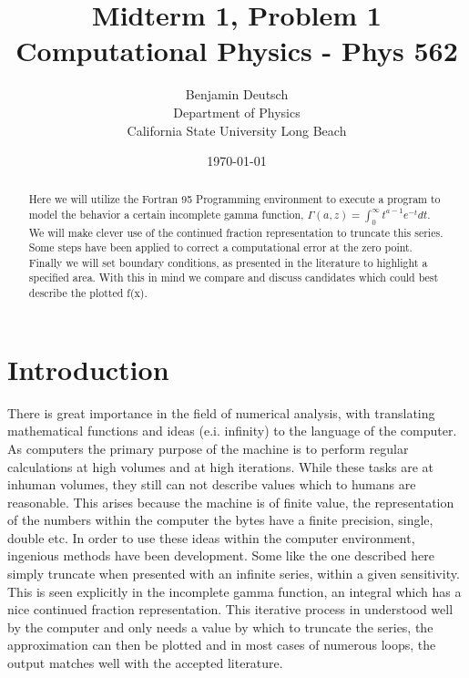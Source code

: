 \documentclass[12pt,letterpaper,notitlepage]{article}
\begin{document}




\title{%
	Midterm 1, Problem 1 \\
\large Computational Physics - Phys 562}
\author{Benjamin Deutsch  \\
Department of Physics\\
California State University Long Beach}
\date{\today}

  
\maketitle



\begin{abstract}
Here we will utilize the Fortran 95 Programming environment to execute a program to model the behavior a certain incomplete gamma function, $\Gamma{\left(a,z\right)}=\int_{0}^{\infty}t^{a-1}e^{-t}{d}t$. We will make clever use of the continued fraction representation to truncate this series. Some steps have been applied to correct a computational error at the zero point. Finally we will set boundary conditions, as presented in the literature to highlight a specified area. With this in mind we compare and  discuss candidates which could best describe the plotted f(x).   
\end{abstract}

\section{Introduction}

There is great importance in the field of numerical analysis, with translating mathematical functions and ideas (e.i. infinity) to the language of the computer. As computers the primary purpose of the machine is to perform regular calculations at high volumes and at high iterations. While these tasks are at inhuman volumes, they still can not describe values which to humans are reasonable. This arises because the machine is of finite value, the representation of the numbers within the computer the bytes have a finite precision, single, double etc. In order to use these ideas within the computer environment, ingenious methods have been development. Some like the one described here simply truncate when presented with an infinite series, within a given sensitivity. This is seen explicitly in the incomplete gamma function, an integral which has a nice continued fraction representation. This iterative process in understood well by the computer and only needs a value by which to truncate the series, the approximation can then be plotted and in most cases of numerous loops, the output matches well with the accepted literature.
           
\end{document}
